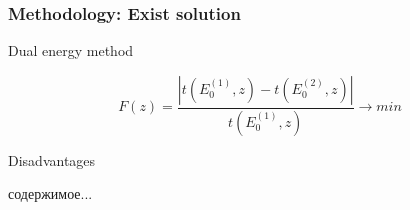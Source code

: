 \documentclass[11pt]{beamer}
\begin{document}
\begin{frame}
    \frametitle{Methodology: Exist solution}
    \begin{block}{Dual energy method}
        
        $$
        F(z) = \frac{|t(E^{(1)}_0,z) - t(E^{(2)}_0,z)|}{t(E^{(1)}_0,z)} \to min
        $$
    \end{block}

    \begin{block}{Disadvantages}
        \begin{itemize}
            содержимое...
        \end{itemize}
    \end{block}
%
%           
%            
\end{frame}
\end{document}
